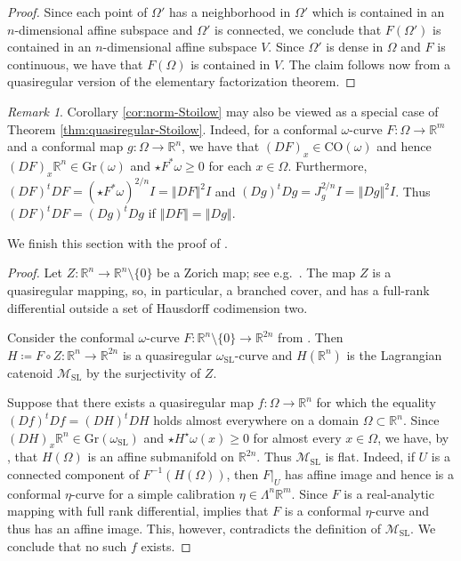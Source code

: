 \documentclass[a4paper,leqno,11pt]{amsart}
\numberwithin{equation}{section}
\theoremstyle{remark}
\newtheorem{remark}[theorem]{Remark}
\theoremstyle{remark}
\newcommand{\R}{\mathbb{R}}
\newcommand{\norm}[1]{ \left\Vert #1 \right\Vert }	%
\newcommand{\Gr}{\mathrm{Gr}}
\newcommand{\SL}{\mathrm{SL}}
\newcommand{\CO}{\mathrm{CO}}
\begin{document}
\begin{proof}
Since each point of $\Omega'$ has a neighborhood in $\Omega'$ which is contained in an $n$-dimensional affine subspace and $\Omega'$ is connected, we conclude that $F(\Omega')$ is contained in an $n$-dimensional affine subspace $V$. Since $\Omega'$ is dense in $\Omega$ and $F$ is continuous, we have that $F(\Omega)$ is contained in $V$. The claim follows now from a quasiregular version of the elementary factorization theorem.
\end{proof}



\begin{remark}
\label{rmk:Stoilow}
Corollary \ref{cor:norm-Stoilow} may also be viewed as a special case of Theorem \ref{thm:quasiregular-Stoilow}. Indeed, for a conformal $\omega$-curve $F\colon \Omega \to \R^m$ and a conformal map $g \colon \Omega \to \R^n$, we have that $(DF)_x \in \CO(\omega)$ and hence $(DF)_x\R^n \in \Gr(\omega)$ and $\star F^{*}\omega \geq 0$ for each $x\in \Omega$. Furthermore, $(DF)^t DF = (\star F^*\omega)^{2/n} I = \norm{DF}^2 I$ and $(Dg)^t Dg = J_g^{2/n} I = \norm{Dg}^2 I$. Thus $(DF)^t DF = (Dg)^t Dg$ if $\norm{DF} = \norm{Dg}$.
\end{remark}


We finish this section with the proof of .

\nonSolvability*

\begin{proof}
Let $Z \colon \R^n \to \R^n\setminus \{0\}$ be a Zorich map; see e.g.~\cite[Section I.3.3]{Ric:93}. The map $Z$ is a quasiregular mapping, so, in particular, a branched cover, and has a full-rank differential outside a set of Hausdorff codimension two.

Consider the conformal $\omega$-curve $F \colon \R^n \setminus \{0\} \to \R^{2n}$ from . Then $H \coloneqq F\circ Z\colon \R^n \to \R^{2n}$ is a quasiregular $\omega_\SL$-curve and $H( \R^n )$ is the Lagrangian catenoid $\mathcal{M}_{\SL}$ by the surjectivity of $Z$.

Suppose that there exists a quasiregular map $f\colon \Omega \to \R^n$ for which the equality $(Df)^t Df = (DH)^t DH$ holds almost everywhere on a domain $\Omega \subset \R^n$. Since $(DH)_x \R^n\in \Gr(\omega_\SL)$ and $\star H^{\star}\omega(x) \geq 0$ for almost every $x\in \Omega$, we have, by , that $H( \Omega )$ is an affine submanifold on $\R^{2n}$. Thus $\mathcal{M}_{\SL}$ is flat. Indeed, if $U$ is a connected component of $F^{-1}( H(\Omega) )$, then $F|_{U}$ has affine image and hence is a conformal $\eta$-curve for a simple calibration $\eta \in \Lambda^n \R^m$. Since $F$ is a real-analytic mapping with full rank differential,  implies that $F$ is a conformal $\eta$-curve and thus has an affine image. This, however, contradicts the definition of $\mathcal{M}_{\SL}$. We conclude that no such $f$ exists.
\end{proof}
\end{document}
